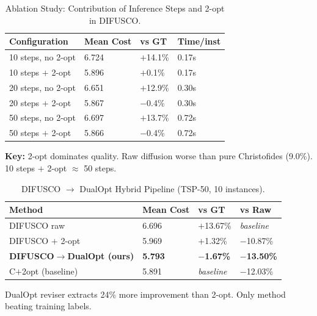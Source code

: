 \documentclass[10pt]{article}
\begin{document}
\begin{table}[h]
\centering
\caption{Ablation Study: Contribution of Inference Steps and 2-opt in DIFUSCO.}
\label{tab:ablation}
\small
\begin{tabular}{@{}llll@{}}
\toprule
\textbf{Configuration} & \textbf{Mean Cost} & \textbf{vs GT} & \textbf{Time/inst} \\
\midrule
10 steps, no 2-opt  & 6.724 & $+$14.1\% & 0.17s \\
10 steps $+$ 2-opt  & 5.896 & $+$0.1\%  & 0.17s \\
20 steps, no 2-opt  & 6.651 & $+$12.9\% & 0.30s \\
20 steps $+$ 2-opt  & 5.867 & $-$0.4\%  & 0.30s \\
50 steps, no 2-opt  & 6.697 & $+$13.7\% & 0.72s \\
50 steps $+$ 2-opt  & 5.866 & $-$0.4\%  & 0.72s \\
\bottomrule
\end{tabular}

\vspace{2pt}
{\footnotesize \textbf{Key:} 2-opt dominates quality. Raw diffusion worse than pure Christofides (9.0\%). 10 steps $+$ 2-opt $\approx$ 50 steps.}
\end{table}


\begin{table}[h]
\centering
\caption{DIFUSCO $\rightarrow$ DualOpt Hybrid Pipeline (TSP-50, 10 instances).}
\label{tab:pipeline}
\small
\begin{tabular}{@{}llll@{}}
\toprule
\textbf{Method} & \textbf{Mean Cost} & \textbf{vs GT} & \textbf{vs Raw} \\
\midrule
DIFUSCO raw              & 6.696 & $+$13.67\% & \textit{baseline} \\
DIFUSCO $+$ 2-opt        & 5.969 & $+$1.32\%  & $-$10.87\% \\
\textbf{DIFUSCO$\rightarrow$DualOpt (ours)} & \textbf{\textcolor{bestgreen}{5.793}} & \textbf{\textcolor{bestgreen}{$-$1.67\%}} & \textbf{\textcolor{bestgreen}{$-$13.50\%}} \\
C$+$2opt (baseline)      & 5.891 & \textit{baseline} & $-$12.03\% \\
\bottomrule
\end{tabular}

\vspace{2pt}
{\footnotesize DualOpt reviser extracts 24\% more improvement than 2-opt. Only method beating training labels.}
\end{table}
\end{document}
